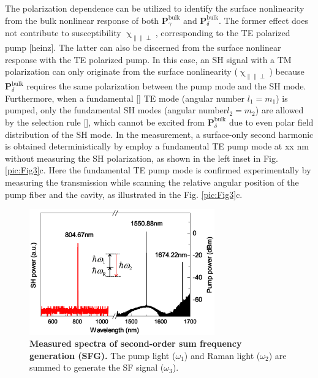 \documentclass[a4paper,8pt,hyperref, twocolumn]{article}
\begin{document}
The polarization dependence can be utilized to identify the surface nonlinearity from the bulk nonlinear response of both $\mathbf{P}^{\mathrm{bulk}}_\gamma$ and $\mathbf{P}^{\mathrm{bulk}}_\delta$.  %
The former effect does not contribute to susceptibility $\upchi_{\parallel \parallel \perp}$, corresponding to the TE polarized pump [heinz]. 
The latter can also be discerned from the surface nonlinear response with the TE polarized pump.
In this case, an SH signal with a TM polarization can only originate from the surface nonlinearity ($\upchi_{\parallel \parallel \perp}$) because $\mathbf{P}^{\mathrm{bulk}}_\delta$ requires the same polarization between the pump mode and the SH mode.
Furthermore, when a fundamental [] TE mode (angular number $l_1=m_1$) is pumped, only the fundamental SH modes (angular number$l_2=m_2$) are allowed by the selection rule [], which cannot be excited from $\mathbf{P}^{\mathrm{bulk}}_\delta$ due to even polar field distribution of the SH mode. 
In the measurement, a surface-only second harmonic is obtained deterministically by employ a fundamental TE pump mode at xx nm without measuring the SH polarization, as shown in the left inset in Fig. \ref{pic:Fig3}c.
Here the fundamental TE pump mode is confirmed experimentally by measuring the transmission while scanning the relative angular position of the pump fiber and the cavity, as illustrated in the  Fig. \ref{pic:Fig3}c.




\begin{figure}[!ht]
\centering
\includegraphics[width=8cm]{Fig4.eps}
\caption{\textbf{Measured spectra of second-order sum frequency generation (SFG). }The pump light ($\omega_1$) and Raman light ($\omega_2$) are summed to generate the SF signal ($\omega_3$).}
\label{pic:Fig4}
\end{figure}
\end{document}
